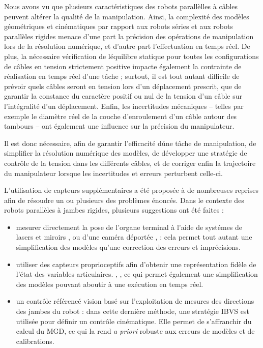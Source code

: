 Nous avons vu que plusieurs caract\'eristiques des robots parall\`elles
\`a c\^ables peuvent alt\'erer la qualit\'e de la manipulation. Ainsi, la
complexit\'e des mod\`eles g\'eom\'etriques et cin\'ematiques par rapport aux
robots s\'eries et aux robots parall\`eles rigides menace d'une part la
pr\'ecision des op\'erations de manipulation lors de la r\'esolution
num\'erique, et d'autre part l'effectuation en temps r\'eel. De plus, la
n\'ecessaire v\'erification de l\'equilibre statique pour toutes les
configurations de c\^ables en tension strictement positive impacte \'egalement
la contrainte de r\'ealisation en temps r\'eel d'une t\^ache ; surtout, il est
tout autant difficile de pr\'evoir quels c\^ables seront en tension lors d'un
d\'eplacement prescrit, que de garantir la constance du caract\`ere positif ou
nul de la tension d'un c\^able sur l'int\'egralit\'e d'un d\'eplacement. Enfin,
les incertitudes m\'ecaniques -- telles par exemple le diam\`etre r\'eel de la
couche d'enroulement d'un c\^able autour des tambours -- ont \'egalement une
influence sur la pr\'ecision du manipulateur.

Il est donc n\'ecessaire, afin de garantir l'efficacit\'e d\'une t\^ache de
manipulation, de simplifier la r\'esolution num\'erique des mod\`eles, de
d\'evelopper une strat\'egie de contr\^ole de la tension dans les diff\'erents
c\^ables, et de corriger enfin la trajectoire du manipulateur lorsque les
incertitudes et erreurs perturbent celle-ci.

L'utilisation de capteurs suppl\'ementaires a \'et\'e propos\'ee \`a de
nombreuses reprises afin de r\'esoudre un ou plusieurs des probl\`emes
\'enonc\'es. Dans le contexte des robots parall\`eles \`a jambes rigides,
plusieurs suggestions ont \'et\'e faites :
\begin{itemize}
 \item mesurer directement la pose de l'organe terminal \`a l'aide de
syst\'emes de lasers et miroirs \cite{marantette1995machine}, \cite{Heeren:1992}
ou d'une cam\'era d\'eport\'ee \cite{dallej.2006}, \cite{paccot.2008} : cela
permet tout autant une simplification des mod\`eles qu'une correction des
erreurs et impr\'ecisions.
\item utiliser des capteurs proprioceptifs afin d'obtenir une repr\'esentation
fid\`ele de l'\'etat des variables articulaires.
\cite{merlet.1993}, \cite{parenti.2000}, ce qui permet \'egalement une
simplification des mod\`eles pouvant aboutir \`a une ex\'ecution en temps
r\'eel. 
\item un contr\^ole r\'ef\'erenc\'e vision bas\'e sur l'exploitation de mesures
des directions des jambes du robot \cite{andreff2007} : dans cette derni\`ere
m\'ethode, une strat\'egie IBVS est utilis\'ee pour d\'efinir un contr\^ole
cin\'ematique. Elle permet de s'affranchir du calcul du MGD, ce qui la rend
{\it a priori} robuste aux erreurs de mod\`eles et de calibrations.
\end{itemize}

